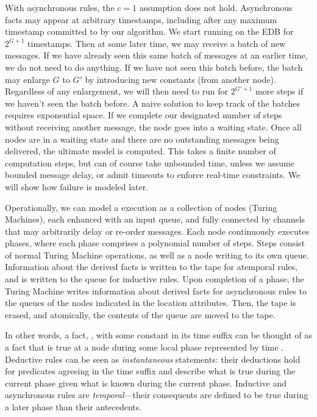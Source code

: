 With asynchronous rules, the $c=1$ assumption does not hold.  Asynchronous facts may appear at arbitrary timestamps, including after any maximum timestamp committed to by our algorithm.  We start running on the EDB for $2^{G+1}$ timestamps.  Then at some later time, we may receive a batch of new messages.  If we have already seen this same batch of messages at an earlier time, we do not need to do anything.  If we have not seen this batch before, the batch may enlarge $G$ to $G'$ by introducing new constants (from another node).  Regardless of any enlargement, we will then need to run for $2^{G'+1}$ more steps if we haven't seen the batch before.  A naive solution to keep track of the batches requires exponential space.  If we complete our designated number of steps without receiving another message, the node goes into a waiting state.  Once all nodes are in a waiting state and there are no outstanding messages being delivered, the ultimate model is computed.  This takes a finite number of computation steps, but can of course take unbounded time, unless we assume bounded message delay, or admit timeouts to enforce real-time constraints.  We will show how failure is modeled later.

Operationally, we can model a \lang execution as a collection of nodes (Turing Machines), each enhanced with an input queue, and fully connected by channels that may arbitrarily delay or re-order messages.  Each node continuously executes phases, where each phase comprises a polynomial number of steps.  Steps consist of normal Turing Machine operations, as well as a node writing to its own queue.  Information about the derived facts is written to the tape for atemporal rules, and is written to the queue for inductive rules.  Upon completion of a phase, the Turing Machine writes information about derived facts for asynchronous rules to the queues of the nodes indicated in the location attributes.  Then, the tape is erased, and atomically, the contents of the queue are moved to the tape.

In other words, a fact, , with some constant  in its time suffix can be thought of as a fact that is true at a node during some local phase represented by time .  Deductive rules can be seen as {\em instantaneous} statements: their deductions hold for predicates agreeing in the time suffix and describe what is true during the current phase given what is known during the current phase. Inductive and asynchronous rules are {\em temporal}---their consequents are defined to be true during a later phase than their antecedents.

